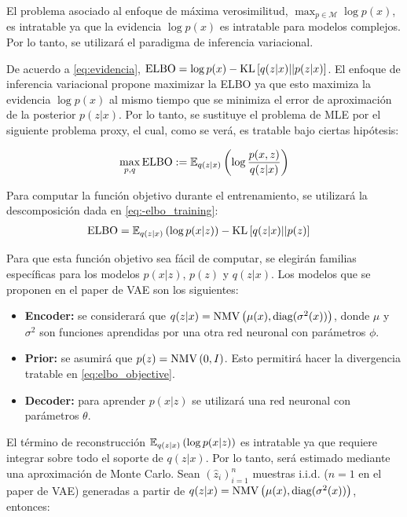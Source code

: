 \documentclass{article}
\begin{document}
El problema asociado al enfoque de máxima verosimilitud, $\max_{p\in\mathcal{M}} \log p(x)$, es intratable ya que la evidencia $\log p(x)$ es intratable para modelos complejos. Por lo tanto, se utilizará el paradigma de inferencia variacional.

De acuerdo a \eqref{eq:evidencia}, $\text{ELBO} = \log p(x) - \text{KL}\left[q(z|x)||p(z|x)\right]$. El enfoque de inferencia variacional propone maximizar la ELBO ya que esto maximiza la evidencia $\log p(x)$ al mismo tiempo que se minimiza el error de aproximación de la posterior $p(z|x)$. Por lo tanto, se sustituye el problema de MLE por el siguiente problema proxy, el cual, como se verá, es tratable bajo ciertas hipótesis:

\begin{equation}
\max\limits_{p,q} \text{ELBO}:= \mathbb{E}_{q(z|x)}\left(\log\frac{p(x,z)}{q(z|x)}\right)
\end{equation}

 Para computar la función objetivo durante el entrenamiento, se utilizará la descomposición dada en \eqref{eq:-elbo_training}:
\begin{align}
	\text{ELBO} &= \mathbb{E}_{q(z|x)}\left(\log p(x|z)\right) - \text{KL}\left[q(z|x)||p(z)\right]  \label{eq:elbo_objective}
\end{align}

Para que esta función objetivo sea fácil de computar, se elegirán familias específicas para los modelos $p(x|z)$, $p(z)$ y $q(z|x)$. Los modelos que se proponen en el paper de VAE son los siguientes:

\begin{itemize}
	\item \textbf{Encoder:} se considerará que $q(z|x)=\text{NMV}\left(\mu(x),\text{diag}(\sigma^2(x))\right)$, donde $\mu$ y $\sigma^2$ son funciones aprendidas por una otra red neuronal con parámetros $\phi$.
	\item \textbf{Prior:} se asumirá que $p(z)=\text{NMV}\left(0,I\right)$. Esto permitirá hacer la divergencia tratable en \eqref{eq:elbo_objective}.
	\item \textbf{Decoder:} para aprender $p(x|z)$ se utilizará una red neuronal con parámetros $\theta$.
\end{itemize}

El término de reconstrucción $\mathbb{E}_{q(z|x)}\left(\log p(x|z)\right)$ es intratable ya que requiere integrar sobre todo el soporte de $q(z|x)$. Por lo tanto, será estimado mediante una aproximación de Monte Carlo. Sean $(\hat{z}_i)_{i=1}^n$ muestras i.i.d. ($n=1$ en el paper de VAE) generadas a partir de $q(z|x)=\text{NMV}\left(\mu(x),\text{diag}(\sigma^2(x))\right)$, entonces:
\end{document}
